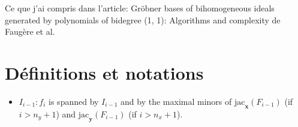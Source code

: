 \documentclass[french]{article}
\begin{document}
Ce que j'ai compris dans l'article: Gröbner bases of bihomogeneous ideals generated by polynomials of bidegree (1, 1): Algorithms and complexity de Faugère et al.
\newline

\section{Définitions et notations}
\begin{itemize}
\item $I_{i-1}:f_i$ is spanned by $I_{i-1}$ and by the maximal minors of $\text{jac}_{\textbf{x}}(F_{i-1})$ (if $i > n_y + 1$) and $\text{jac}_{\textbf{y}}(F_{i-1})$ (if $i > n_x + 1$).
\end{itemize}
\end{document}
